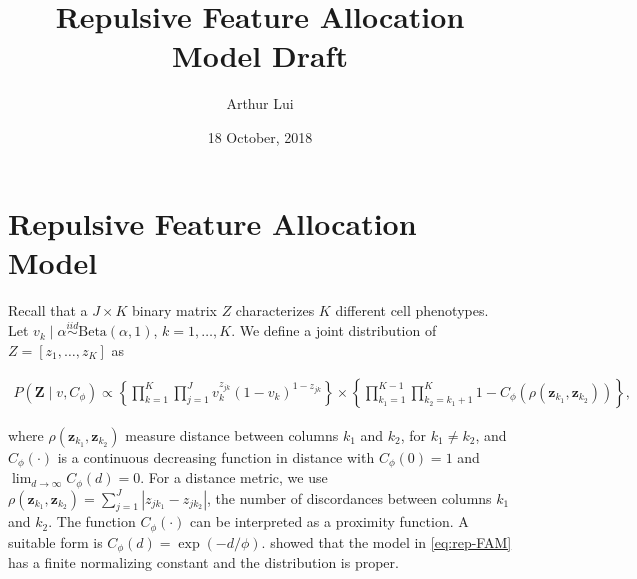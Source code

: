 \documentclass[12pt]{article} %
\title{Repulsive Feature Allocation Model Draft}
\author{Arthur Lui}
\date{18 October, 2018} %
\newcommand{\p}[1]{\left(#1\right)}
\newcommand{\bk}[1]{\left[#1\right]}
\newcommand{\bc}[1]{ \left\{#1\right\} }
\newcommand{\abs}[1]{ \left|#1\right| }
\newcommand{\Beta}{ \text{Beta} }
\newcommand{\iid}{\overset{iid}{\sim}}
\begin{document}
\maketitle


\section{Repulsive Feature Allocation Model}\label{sec:repfam}


Recall that a $J \times K$ binary matrix $Z$ characterizes $K$ different cell phenotypes.
Let $v_k \mid \alpha \iid \Beta(\alpha, 1)$, $k = 1, \dots , K$.
We define a joint distribution of $Z = \bk{z_1, \dots, z_K}$ as

\begin{eqnarray}
P(\bm Z \mid v, C_\phi) \propto \bc{\prod_{k=1}^K  \prod_{j=1}^J
v_k^{z_{jk}}(1-v_k)^{1-z_{jk}}} \times
  \bc{
    \prod_{k_1=1}^{K-1}\prod_{k_2=k_1+1}^{K}
    1 - C_\phi\p{\rho(\bm z_{k_1}, \bm z_{k_2})}
  },
\label{eq:rep-FAM}
\end{eqnarray}


where $\rho(\bm z_{k_1}, \bm z_{k_2})$ measure distance between columns $k_1$ and
$k_2$, for $k_1 \neq k_2$, and $C_\phi(\cdot)$ is a continuous decreasing
function in distance with $C_\phi(0)=1$ and
$\lim_{d\rightarrow\infty}C_\phi(d)= 0$. For a distance metric, we use
$\rho(\bm z_{k_1}, \bm z_{k_2})=\sum_{j=1}^J \abs{z_{jk_1} - z_{jk_2}}$, the number
of discordances between columns $k_1$ and $k_2$. The function $C_\phi(\cdot)$
can be interpreted as a proximity function. A suitable form is $C_\phi(d) =
\exp\p{-d/\phi}$. \cite{quinlan2017parsimonious} showed that the model in
\eqref{eq:rep-FAM} has a finite normalizing constant and the distribution is
proper.

\end{document}
